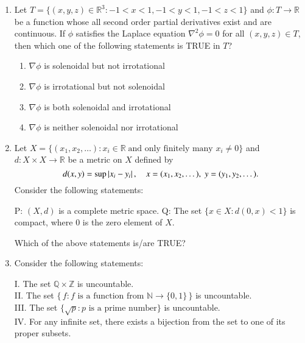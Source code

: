 \documentclass[journal,12pt,onecolumn]{IEEEtran}
\theoremstyle{remark}
\begin{document}
\begin{enumerate}[start=1, label=Q.\arabic*]
\hfill{}


\item Let $T = \{(x,y,z) \in \mathbb{R}^3 : -1<x<1, -1<y<1, -1<z<1\}$ and $\phi : T \to \mathbb{R}$ be a function whose all second order partial derivatives exist and are continuous. If $\phi$ satisfies the Laplace equation $\nabla^2 \phi = 0$ for all $(x,y,z) \in T$, then which one of the following statements is TRUE in $T$?  
\begin{enumerate}
\item $\nabla \phi$ is solenoidal but not irrotational  
\item $\nabla \phi$ is irrotational but not solenoidal  
\item $\nabla \phi$ is both solenoidal and irrotational  
\item $\nabla \phi$ is neither solenoidal nor irrotational  
\end{enumerate}

\hfill{}


\item Let $X = \{(x_1,x_2,\dots) : x_i \in \mathbb{R} \; \text{and only finitely many } x_i \neq 0\}$ and $d : X \times X \to \mathbb{R}$ be a metric on $X$ defined by  
\[
d(x,y) = \sup \left\vert x_i - y_i\right\vert, \quad x=(x_1,x_2,\dots), \; y=(y_1,y_2,\dots).
\]  
Consider the following statements:  

P: $(X,d)$ is a complete metric space.  
Q: The set $\{x \in X : d(0,x) < 1\}$ is compact, where $0$ is the zero element of $X$.  

Which of the above statements is/are TRUE?  
\begin{enumerate}
\end{enumerate}

\hfill{}


\item Consider the following statements:

I. The set $\mathbb{Q} \times \mathbb{Z}$ is uncountable. \\
II. The set $\{\, f : f \text{ is a function from } \mathbb{N} \to \{0,1\} \,\}$ is uncountable. \\
III. The set $\{\sqrt{p} : p \text{ is a prime number}\}$ is uncountable. \\
IV. For any infinite set, there exists a bijection from the set to one of its proper subsets. \\


\end{enumerate}
\end{document}
